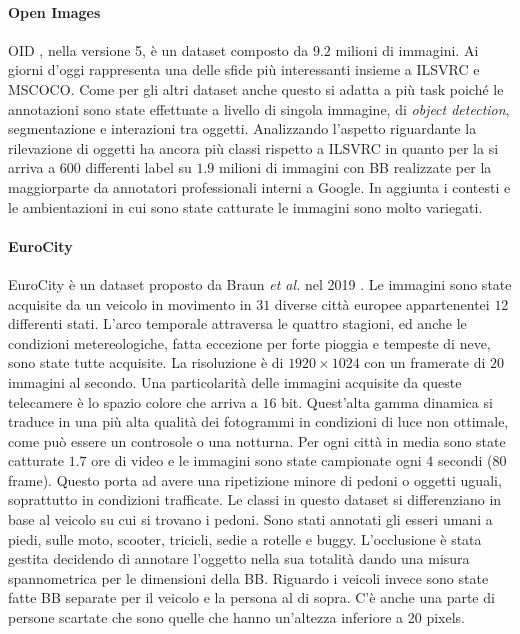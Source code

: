 \paragraph{Open Images} 
\ac{OID} \cite{krasin2017openimages}, nella versione 5, è un dataset composto da $9.2$ milioni di immagini. Ai giorni d'oggi rappresenta una delle sfide più interessanti insieme a \ac{ILSVRC} e \ac{MSCOCO}. Come per gli altri dataset anche questo si adatta a più task poiché le annotazioni sono state effettuate a livello di singola immagine, di \textit{object detection}, segmentazione e interazioni tra oggetti. 
Analizzando l'aspetto riguardante la rilevazione di oggetti ha ancora più classi rispetto a \ac{ILSVRC} in quanto per la si arriva a $600$ differenti label su $1.9$ milioni di immagini con \ac{BB} realizzate per la maggiorparte da annotatori professionali interni a Google. In aggiunta i contesti e le ambientazioni in cui sono state catturate le immagini sono molto variegati.
\paragraph{EuroCity}  EuroCity è un dataset proposto da Braun \textit{et al. } nel 2019 \cite{braun2018eurocity}. Le immagini sono state acquisite da un veicolo in movimento in $31$ diverse città europee appartenentei $12$ differenti stati. L'arco temporale attraversa le quattro stagioni, ed anche le condizioni metereologiche, fatta eccezione per forte pioggia e tempeste di neve, sono state tutte acquisite. 
La risoluzione è di $1920 \times 1024$ con un framerate di $20$ immagini al secondo. Una particolarità delle immagini acquisite da queste telecamere è lo spazio colore che arriva a $16$ bit. Quest'alta gamma dinamica si traduce in una più alta qualità dei fotogrammi in condizioni di luce non ottimale, come può essere un controsole o una notturna. 
Per ogni città in media sono state catturate $1.7$ ore di video e le immagini sono state campionate ogni $4$ secondi ($80$ frame). Questo porta ad avere una ripetizione minore di pedoni o oggetti uguali, soprattutto in condizioni trafficate.
Le classi in questo dataset si differenziano in base al veicolo su cui si trovano i pedoni. Sono stati annotati gli esseri umani a piedi, sulle moto, scooter, tricicli, sedie a rotelle e buggy. 
L'occlusione è stata gestita decidendo di annotare l'oggetto nella sua totalità dando una misura spannometrica per le dimensioni della \ac{BB}. 
Riguardo i veicoli invece sono state fatte \ac{BB} separate per il veicolo e la persona al di sopra. 
C'è anche una parte di persone scartate che sono quelle che hanno un'altezza inferiore a 20 pixels. 


